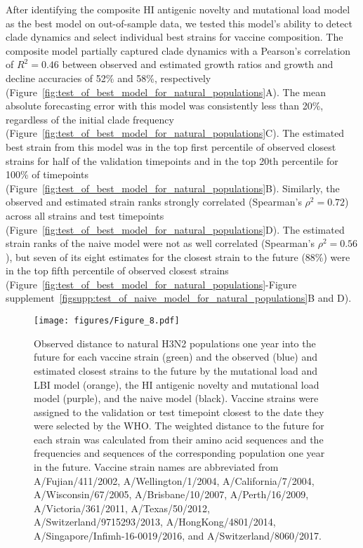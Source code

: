 After identifying the composite HI antigenic novelty and mutational load model as the best model on out-of-sample data, we tested this model's ability to detect clade dynamics and select individual best strains for vaccine composition.
The composite model partially captured clade dynamics with a Pearson's correlation of $R^2 = 0.46$ between observed and estimated growth ratios and growth and decline accuracies of 52\% and 58\%, respectively (Figure~\ref{fig:test_of_best_model_for_natural_populations}A).
The mean absolute forecasting error with this model was consistently less than 20\%, regardless of the initial clade frequency (Figure~\ref{fig:test_of_best_model_for_natural_populations}C).
The estimated best strain from this model was in the top first percentile of observed closest strains for half of the validation timepoints and in the top 20th percentile for 100\% of timepoints (Figure~\ref{fig:test_of_best_model_for_natural_populations}B).
Similarly, the observed and estimated strain ranks strongly correlated (Spearman's $\rho^2 = 0.72$) across all strains and test timepoints (Figure~\ref{fig:test_of_best_model_for_natural_populations}D).
The estimated strain ranks of the naive model were not as well correlated (Spearman's $\rho^2 = 0.56$), but seven of its eight estimates for the closest strain to the future (88\%) were in the top fifth percentile of observed closest strains (Figure~\ref{fig:test_of_best_model_for_natural_populations}-Figure supplement~\ref{figsupp:test_of_naive_model_for_natural_populations}B and D).

\begin{figure}[htb]
  \texttt{[image: figures/Figure\_8.pdf]}
  \caption{
    Observed distance to natural H3N2 populations one year into the future for each vaccine strain (green) and the observed (blue) and estimated closest strains to the future by the mutational load and LBI model (orange), the HI antigenic novelty and mutational load model (purple), and the naive model (black).
    Vaccine strains were assigned to the validation or test timepoint closest to the date they were selected by the WHO.
    The weighted distance to the future for each strain was calculated from their amino acid sequences and the frequencies and sequences of the corresponding population one year in the future.
    Vaccine strain names are abbreviated from A/Fujian/411/2002, A/Wellington/1/2004, A/California/7/2004, A/Wisconsin/67/2005, A/Brisbane/10/2007, A/Perth/16/2009, A/Victoria/361/2011, A/Texas/50/2012, A/Switzerland/9715293/2013, A/HongKong/4801/2014, A/Singapore/Infimh-16-0019/2016, and A/Switzerland/8060/2017.
  }
  \label{fig:vaccine_comparison}

  \label{figsupp:vaccine_comparison_relative_distance}
\end{figure}

